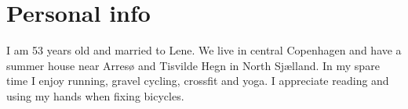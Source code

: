 \documentclass[10pt, a4paper]{article}
\begin{document}
\section{Personal info}
I am 53 years old and married to Lene. We live in central Copenhagen and have a summer house near Arresø and Tisvilde Hegn in North Sjælland. In my spare time I enjoy running, gravel cycling, crossfit and yoga. I appreciate reading and using my hands when fixing bicycles.
\end{document}
